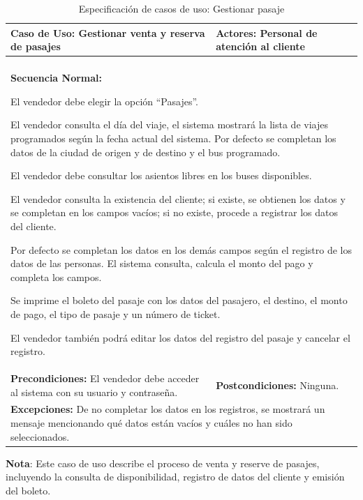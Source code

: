 	\begingroup
	\begin{longtable}{m{7.5cm}|m{7.5cm}}
		\caption[Especificación de casos de uso: Gestionar venta y reserva de pasaje]{\newline Especificación de casos de uso: Gestionar pasaje} \label{tab:tabla3_6}\\
		\toprule
		\textbf{Caso de Uso:} Gestionar venta y reserva de pasajes & \textbf{Actores:} Personal de atención al cliente \\
		\midrule
		\endfirsthead
		\endhead
		\bottomrule
		\endlastfoot
		\multicolumn{2}{m{15cm}}{\textbf{Descripción:} Este caso de uso hace referencia a la venta y reservas de pasajes para los buses.} \\ \hline
		
		\multicolumn{2}{m{15cm}}{\textbf{Secuencia Normal:}
			
			El vendedor debe elegir la opción “Pasajes”.
			
			El vendedor consulta el día del viaje, el sistema mostrará la lista de viajes programados según la fecha actual del sistema. Por defecto se completan los datos de la ciudad de origen y de destino y el bus programado.
			
			El vendedor debe consultar los asientos libres en los buses disponibles.
			
			El vendedor consulta la existencia del cliente; si existe, se obtienen los datos y se completan en los campos vacíos; si no existe, procede a registrar los datos del cliente.
			
			Por defecto se completan los datos en los demás campos según el registro de los datos de las personas. El sistema consulta, calcula el monto del pago y completa los campos.
			
			Se imprime el boleto del pasaje con los datos del pasajero, el destino, el monto de pago, el tipo de pasaje y un número de ticket.
			
			El vendedor también podrá editar los datos del registro del pasaje y cancelar el registro.
		} \\ \hline
		
		\textbf{Precondiciones:} El vendedor debe acceder al sistema con su usuario y contraseña. & \textbf{Postcondiciones:} Ninguna. \\ \hline
		
		\multicolumn{2}{m{15cm}}{\textbf{Excepciones:} De no completar los datos en los registros, se mostrará un mensaje mencionando qué datos están vacíos y cuáles no han sido seleccionados.
		} \\
		
	\end{longtable}
	\endgroup 
	\vspace{-20pt}  %
	\textbf{Nota}: Este caso de uso describe el proceso de venta y reserve de pasajes, incluyendo la consulta de disponibilidad, registro de datos del cliente y emisión del boleto.
	
